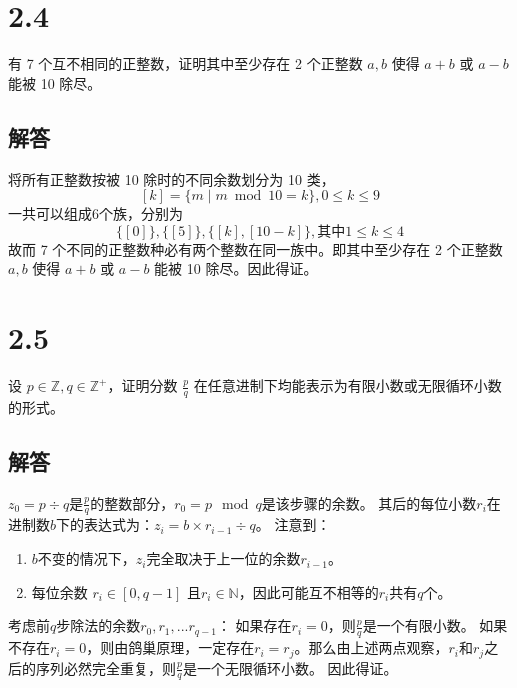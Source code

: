 \documentclass[12pt]{article}
\begin{document}
\section*{2.4}
有 7 个互不相同的正整数，证明其中至少存在 2 个正整数 $a, b$ 使得 $a + b$ 或 $a - b$ 能被 10 除尽。
\subsection*{解答}
将所有正整数按被 10 除时的不同余数划分为 10 类，
\[[k]=\{m \mid m \bmod 10 =k\}, 0 \leq k\leq 9\]
一共可以组成6个族，分别为
\[\{[0]\}, \{[5]\}, \{[k], [10-k]\},其中1 \leq k\leq 4\]
故而 7 个不同的正整数种必有两个整数在同一族中。即其中至少存在 2 个正整数 $a, b$ 使得 $a + b$ 或 $a - b$ 能被 10 除尽。因此得证。

\section*{2.5}
设 $p \in \mathbb{Z}, q \in \mathbb{Z}^+$，证明分数 $\frac{p}{q}$ 在任意进制下均能表示为有限小数或无限循环小数的形式。
\subsection*{解答}
$z_0 = p \div q$是$\frac{p}{q}$的整数部分，$r_0 = p \mod q$是该步骤的余数。
其后的每位小数$r_{i}$在进制数$b$下的表达式为：$z_{i} = b \times r_{i-1} \div q$。
注意到：
\begin{enumerate}
    \item $b$不变的情况下，$z_{i}$完全取决于上一位的余数$r_{i-1}$。
    \item 每位余数 $r_{i} \in [0, q-1]$ 且$r_{i} \in \mathbb{N}$，因此可能互不相等的$r_{i}$共有$q$个。
\end{enumerate}

考虑前$q$步除法的余数$r_{0}, r_{1},...r_{q-1}$：
如果存在$r_{i}=0$，则$\frac{p}{q}$是一个有限小数。
如果不存在$r_{i}=0$，则由鸽巢原理，一定存在$r_{i}=r_{j}$。那么由上述两点观察，$r_{i}$和$r_{j}$之后的序列必然完全重复，则$\frac{p}{q}$是一个无限循环小数。
因此得证。
\end{document}
